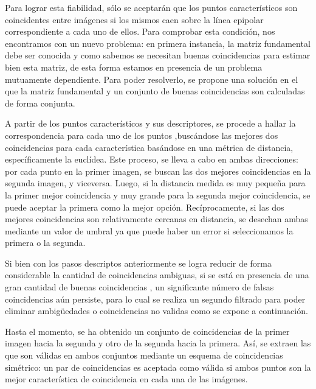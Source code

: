 \documentclass[a4paper,11pt,spanish]{article}
\begin{document}
Para lograr esta fiabilidad, sólo se aceptarán que los puntos característicos son coincidentes entre imágenes si los mismos caen sobre la línea epipolar correspondiente a cada uno de ellos. Para comprobar esta condición, nos encontramos con un nuevo problema: en primera instancia, la matriz fundamental debe ser conocida y como sabemos se necesitan buenas coincidencias para estimar bien esta matriz, de esta forma estamos en presencia de un problema mutuamente dependiente. Para poder resolverlo, se propone una solución en el que la matriz fundamental y un conjunto de buenas coincidencias son calculadas de forma conjunta.

A partir de los puntos característicos y sus descriptores, se procede a hallar la correspondencia para cada uno de los puntos %
,buscándose %
las mejores dos coincidencias para cada característica basándose en una métrica de distancia, específicamente la euclídea.
Este proceso, se lleva a cabo en ambas direcciones: por cada punto en la primer imagen, se buscan las dos mejores coincidencias en la segunda imagen, y viceversa. Luego, si la distancia medida es muy pequeña para la primer mejor coincidencia y muy grande para la segunda mejor coincidencia, se puede aceptar la primera como la mejor opción. Recíprocamente, si las dos mejores coincidencias son relativamente cercanas en distancia, se desechan ambas mediante un valor de umbral ya que puede haber un error si seleccionamos la primera o la segunda.

Si bien con los pasos descriptos anteriormente se logra reducir de forma considerable la cantidad de coincidencias ambiguas, si se está en presencia de una gran cantidad de buenas coincidencias \cite{citeulike:9456628}, un significante número de falsas coincidencias aún persiste, para lo cual se realiza un segundo filtrado para poder eliminar ambigüedades o coincidencias no validas como se expone a continuación.

Hasta el momento, se ha obtenido un conjunto de coincidencias de la primer imagen hacia la segunda y otro de la segunda hacia la primera. Así, se extraen las que son válidas en ambos conjuntos mediante un esquema de coincidencias simétrico: un par de coincidencias es aceptada como válida si ambos puntos son la mejor característica de coincidencia en cada una de las imágenes.%
\end{document}
